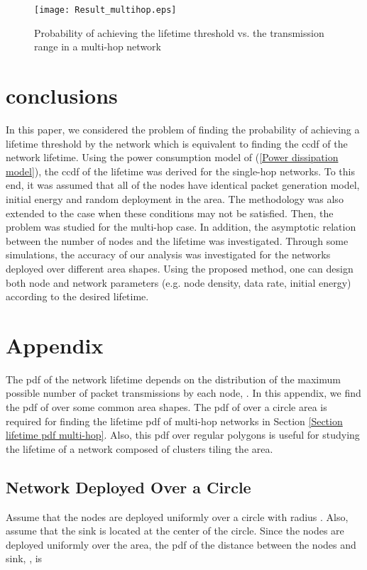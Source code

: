 \documentclass[conference]{IEEEtran}
\begin{document}
\begin{figure}[!h]
\centering
\texttt{[image: Result\_multihop.eps]}
\caption{Probability of achieving the lifetime threshold vs. the
transmission range in a multi-hop network} \label{Fig multihop Tx
range}
\end{figure}

\section{conclusions}\label{Section Conclusion}
In this paper, we considered the problem of finding the probability
of achieving a lifetime threshold by the network which is equivalent
to finding the ccdf of the network lifetime. Using the power
consumption model of (\ref{Power dissipation model}), the ccdf of
the lifetime was derived for the single-hop networks. To this end,
it was assumed that all of the nodes have identical packet
generation model, initial energy and random deployment in the area.
The methodology was also extended to the case when these conditions
may not be satisfied. Then, the problem was studied for the
multi-hop case. In addition, the asymptotic relation between the
number of nodes and the lifetime was investigated. Through some
simulations, the accuracy of our analysis was investigated for the
networks deployed over different area shapes. Using the proposed
method, one can design both node and network parameters (e.g. node
density, data rate, initial energy) according to the desired
lifetime.

\section*{Appendix}\label{Appendix pdf of p}
The pdf of the network lifetime depends on the distribution of the
maximum possible number of packet transmissions by each node, .
In this appendix, we find the pdf of  over some common area
shapes. The pdf of  over a circle area is required for finding
the lifetime pdf of multi-hop networks in Section \ref{Section
lifetime pdf multi-hop}. Also, this pdf over regular polygons is
useful for studying the lifetime of a network composed of clusters
tiling the area.

\subsection{Network Deployed Over a Circle}
Assume that the nodes are deployed uniformly over a circle with radius .
Also, assume that the sink is located at the center of the circle.
Since the nodes are deployed uniformly over the area, the pdf of the
distance between the nodes and sink, , is
\end{document}
